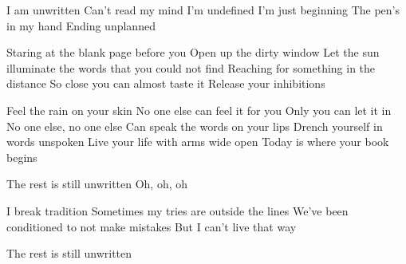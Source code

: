 \begin{verse*}
I am unwritten
Can't read my mind
I'm undefined
I'm just beginning
The pen's in my hand
Ending unplanned
\end{verse*}

\begin{prechorus}
Staring at the blank page before you
Open up the dirty window
Let the sun illuminate the words that you could not find
Reaching for something in the distance
So close you can almost taste it
Release your inhibitions
\end{prechorus}

\begin{chorus}
Feel the rain on your skin
No one else can feel it for you
Only you can let it in
No one else, no one else
Can speak the words on your lips
Drench yourself in words unspoken
Live your life with arms wide open
Today is where your book begins
\end{chorus}

\begin{verse*}
The rest is still unwritten
Oh, oh, oh
\end{verse*}

\begin{verse*}
I break tradition
Sometimes my tries are outside the lines
We've been conditioned to not make mistakes
But I can't live that way
\end{verse*}

\theprechorus
\thechorus[2]
\theprechorus
\thechorus[2]

\begin{verse*}
The rest is still unwritten 
\end{verse*}
